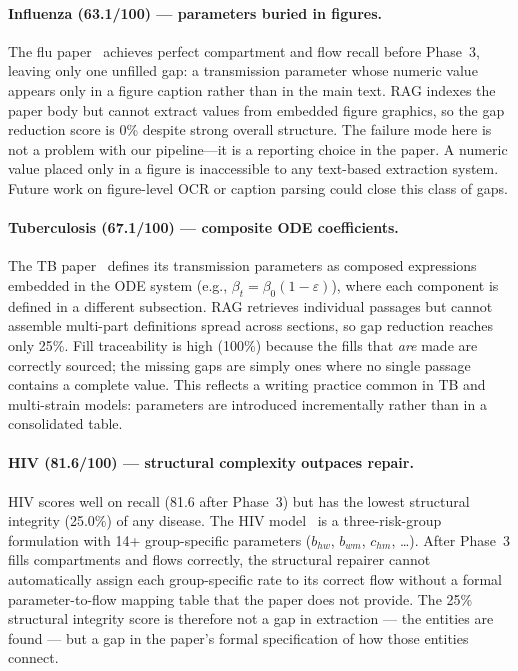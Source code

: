 \paragraph{Influenza (63.1/100) --- parameters buried in figures.}
The flu paper~\cite{Corbella2017MonitoringAP} achieves perfect compartment and flow
recall before Phase~3, leaving only one unfilled gap: a transmission parameter whose
numeric value appears only in a figure caption rather than in the main text.
RAG indexes the paper body but cannot extract values from embedded figure graphics,
so the gap reduction score is 0\% despite strong overall structure.
The failure mode here is not a problem with our pipeline---it is a reporting choice in
the paper. A numeric value placed only in a figure is inaccessible to any text-based
extraction system. Future work on figure-level OCR or caption parsing could close
this class of gaps.

\paragraph{Tuberculosis (67.1/100) --- composite ODE coefficients.}
The TB paper~\cite{tuberculosis} defines its transmission parameters as composed
expressions embedded in the ODE system (e.g., $\beta_{t} = \beta_0 (1 - \varepsilon)$),
where each component is defined in a different subsection.
RAG retrieves individual passages but cannot assemble multi-part definitions spread
across sections, so gap reduction reaches only 25\%.
Fill traceability is high (100\%) because the fills that \emph{are} made are correctly
sourced; the missing gaps are simply ones where no single passage contains a complete value.
This reflects a writing practice common in TB and multi-strain models: parameters are
introduced incrementally rather than in a consolidated table.

\paragraph{HIV (81.6/100) --- structural complexity outpaces repair.}
HIV scores well on recall (81.6 after Phase~3) but has the lowest structural integrity
(25.0\%) of any disease. The HIV model~\cite{Espitia2022} is a three-risk-group formulation
with 14+ group-specific parameters ($b_{hw}$, $b_{wm}$, $c_{hm}$, \ldots).
After Phase~3 fills compartments and flows correctly, the structural repairer cannot
automatically assign each group-specific rate to its correct flow without a formal
parameter-to-flow mapping table that the paper does not provide.
The 25\% structural integrity score is therefore not a gap in extraction --- the
entities are found --- but a gap in the paper's formal specification of how those
entities connect.

